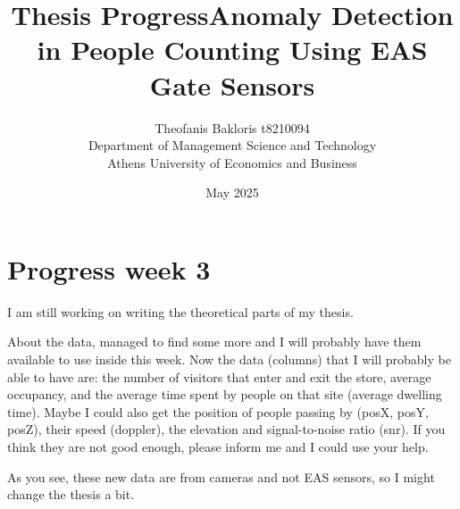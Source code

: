 \documentclass{article}
\title{\textbf{Thesis Progress}}
\author{Theofanis Bakloris t8210094\\
Department of Management Science and Technology\\
Athens University of Economics and Business}
\date{May 2025}
\begin{document}

\maketitle

\title{\textbf{Anomaly Detection in People Counting Using EAS Gate Sensors\\
}}


\section{Progress week 3}

I am still working on writing the theoretical parts of my thesis.

About the data, managed to find some more and I will probably have them available to use inside this week. Now the data (columns) that I will probably be able to have are: the number of visitors that enter and exit the store, average occupancy, and the average time spent by people on that site (average dwelling time). Maybe I could also get the position of people passing by (posX, posY, posZ), their speed (doppler), the elevation and signal-to-noise ratio (snr). If you think they are not good enough, please inform me and I could use your help.

As you see, these new data are from cameras and not EAS sensors, so I might change the thesis a bit.
\end{document}
